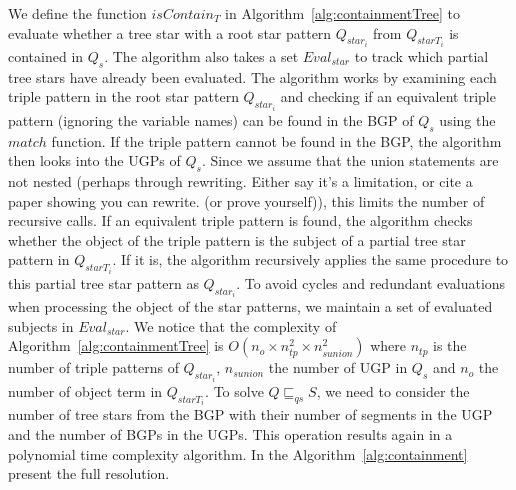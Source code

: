 We define the function $isContain_{T}$ in Algorithm~\ref{alg:containmentTree} to evaluate whether a tree star  with a root star pattern $Q_{star_i}$ from $Q_{starT_i}$ is contained in $Q_s$. 
The algorithm also takes a set $Eval_{star}$ to track which partial tree stars have already been evaluated.
The algorithm works by examining each triple pattern in the root star pattern $Q_{star_i}$ and checking if an equivalent triple pattern (ignoring the variable names) can be found in the BGP of $Q_s$ using the $match$ function.
If the triple pattern cannot be found in the BGP, the algorithm then looks into the UGPs of $Q_s$. 
Since we assume that the union statements are not nested (perhaps  through rewriting. Either say it's a limitation, or cite a paper showing you can rewrite. (or prove yourself)), this limits the number of recursive calls.
If an equivalent triple pattern is found, the algorithm checks whether the object of the triple pattern is the subject of a partial tree star pattern in $Q_{starT_i}$.
If it is, the algorithm recursively applies the same procedure to this partial tree star pattern as $Q_{star_i}$.
To avoid cycles and redundant evaluations when processing the object of the star patterns, we maintain a set of evaluated subjects in $Eval_{star}$.
We notice that the complexity of Algorithm~\ref{alg:containmentTree} is $O( n_o \times n_{tp}^2 \times n_{sunion}^2)$
where $n_{tp}$ is the number of triple patterns of $Q_{star_i}$, $n_{sunion}$ the number of UGP in $Q_s$ and $n_o$ the number of object term in $Q_{starT_i}$.
To solve $Q \sqsubseteq_{qs} S$, we need to consider the number of tree stars from the BGP with their number of segments in the UGP and the number of BGPs in the UGPs.
This operation results again in a polynomial time complexity algorithm.
In the  Algorithm~\ref{alg:containment} present the full resolution.
